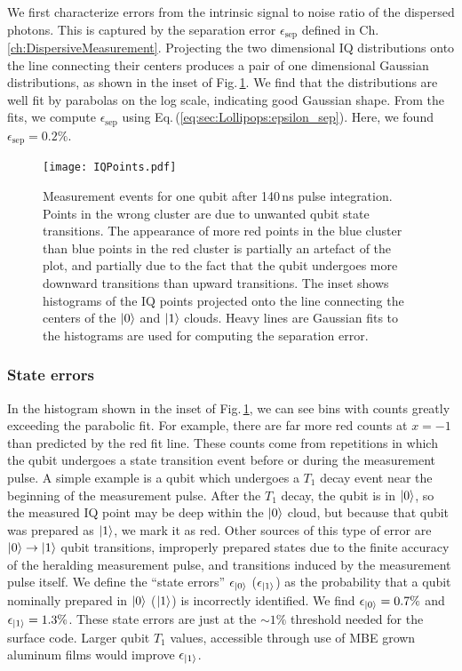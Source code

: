 We first characterize errors from the intrinsic signal to noise ratio of the dispersed photons.
This is captured by the separation error $\epsilon_\text{sep}$ defined in Ch.\,\ref{ch:DispersiveMeasurement}.
Projecting the two dimensional IQ distributions onto the line connecting their centers produces a pair of one dimensional Gaussian distributions, as shown in the inset of Fig.\,\ref{Fig:ch:results:sec:timeDependence:IQPoints}.
We find that the distributions are well fit by parabolas on the log scale, indicating good Gaussian shape.
From the fits, we compute $\epsilon_{\text{sep}}$ using Eq.\,(\ref{eq:sec:Lollipops:epsilon_sep}).
Here, we found $\epsilon_{\text{sep}} = 0.2\%$.

\begin{figure}
\begin{centering}
\texttt{[image: IQPoints.pdf]}
\par\end{centering}
\caption{Measurement events for one qubit after 140\,ns pulse integration. Points in the wrong cluster are due to unwanted qubit state transitions. The appearance of more red points in the blue cluster than blue points in the red cluster is partially an artefact of the plot, and partially due to the fact that the qubit undergoes more downward transitions than upward transitions. The inset shows histograms of the IQ points projected onto the line connecting the centers of the $|0\rangle$ and $|1\rangle$ clouds. Heavy lines are Gaussian fits to the histograms are used for computing the separation error.}
\label{Fig:ch:results:sec:timeDependence:IQPoints}
\end{figure}

\subsubsection{State errors}

In the histogram shown in the inset of Fig.\,\ref{Fig:ch:results:sec:timeDependence:IQPoints}, we can see bins with counts greatly exceeding the parabolic fit.
For example, there are far more red counts at $x=-1$ than predicted by the red fit line.
These counts come from repetitions in which the qubit undergoes a state transition event before or during the measurement pulse.
A simple example is a qubit which undergoes a $T_1$ decay event near the beginning of the measurement pulse.
After the $T_1$ decay, the qubit is in $|0\rangle$, so the measured IQ point may be deep within the $|0\rangle$ cloud, but because that qubit was prepared as $|1\rangle$, we mark it as red.
Other sources of this type of error are $|0\rangle \rightarrow |1\rangle$ qubit transitions, improperly prepared states due to the finite accuracy of the heralding measurement pulse, and transitions induced by the measurement pulse itself.
We define the ``state errors'' $\epsilon_{|0\rangle}$ ($\epsilon_{|1\rangle}$) as the probability that a qubit nominally prepared in $|0\rangle$ ($|1\rangle$) is incorrectly identified.
We find $\epsilon_{|0\rangle}=0.7\%$ and $\epsilon_{|1\rangle}=1.3\%$.
These state errors are just at the $\sim 1\%$ threshold needed for the surface code.
Larger qubit $T_1$ values, accessible through use of MBE grown aluminum films \cite{Megrant:highQ2012} would improve $\epsilon_{|1\rangle}$.

